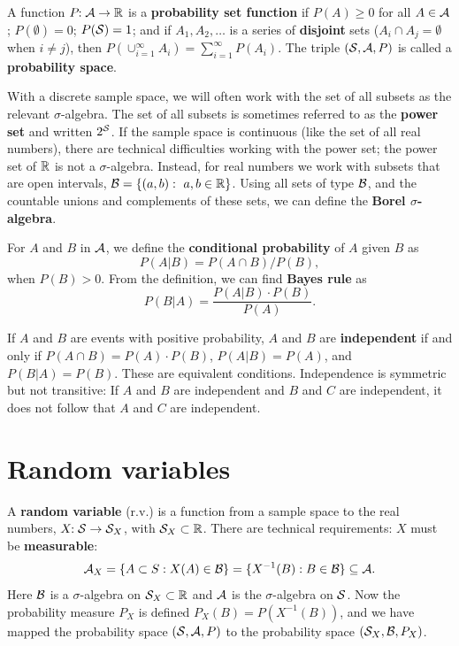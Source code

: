 \documentclass[10pt]{article}
\begin{document}
A function $P\!\!:\mathcal{A} \rightarrow \mathbb{R}$ is a \textbf{probability set function}  if $P(A)\geq0$ for
all $A\in\mathcal{A}$; $P(\emptyset)=0$; $P(\mathcal{S})=1$; and if $A_1,A_2,\dots$ is a
series of \textbf{disjoint} sets ($A_i\cap A_j=\emptyset$ when $i\neq j$), then
$P(\cup_{i=1}^\infty A_i)=\sum_{i=1}^\infty P(A_i)$. The triple
$(\mathcal{S},\mathcal{A},P)$ is called a \textbf{probability space}.

With a discrete sample space, we will often work with the set of all subsets as
the relevant $\sigma$-algebra. The set of all subsets is sometimes referred to as the
\textbf{power set} and written $2^{\mathcal{S}}$. If the sample space is continuous
(like the set of all real numbers), there are technical difficulties working
with the power set; the power set of $\mathbb{R}$ is not a $\sigma$-algebra. Instead,
for real numbers we work with subsets that are open intervals, $\mathcal{B} = \{(a,b):
\ a,b\in\mathbb{R}\}$. Using all sets of type $\mathcal{B}$, and the countable unions and
complements of these sets, we can define the \textbf{Borel $\sigma$-algebra}.

For $A$ and $B$ in $\mathcal{A}$, we define the \textbf{conditional probability} of $A$ given $B$
as \[ P(A|B) = P(A\cap B)/P(B),\] when $P(B)>0$. From the definition, we can find 
\textbf{Bayes rule}
as 
\[ P(B|A) = \frac{ P(A|B)\cdot P(B)}{P(A)}.\]

If $A$ and $B$ are events with positive probability, $A$ and $B$ are \textbf{independent} if
and only if $P(A\cap B) = P(A)\cdot P(B)$, $P(A|B)=P(A)$, and $P(B|A)=P(B)$. These are equivalent
conditions. 
Independence is symmetric but not transitive: If $A$ and $B$ are independent and
$B$ and $C$ are independent, it does not follow that $A$ and $C$ are
independent.

\section{Random variables}

A \textbf{random variable}  (r.v.) is a function from a sample space to the real numbers,
$X\!\!: \mathcal{S} \rightarrow \mathcal{S}_X$, with $\mathcal{S}_X\subset \mathbb{R}$. There are technical requirements:
$X$ must be \textbf{measurable}:
\[ \mathcal{A}_X = \{A\subset S: X(A) \in \mathcal{B}\} = \{X^{-1}(B): B\in \mathcal{B}\}\subseteq \mathcal{A}.\]
Here $\mathcal{B}$ is a $\sigma$-alg\-ebra on $\mathcal{S}_X\subset\mathbb{R}$ and $\mathcal{A}$ is the $\sigma$-alge\-bra on $\mathcal{S}$.
Now the probability measure $P_X$ is defined $P_X(B) = P(X^{-1}(B))$, and we have mapped
the probability space $(\mathcal{S},\mathcal{A},P)$ to the probability space $(\mathcal{S}_X,\mathcal{B},P_X)$.
\end{document}
